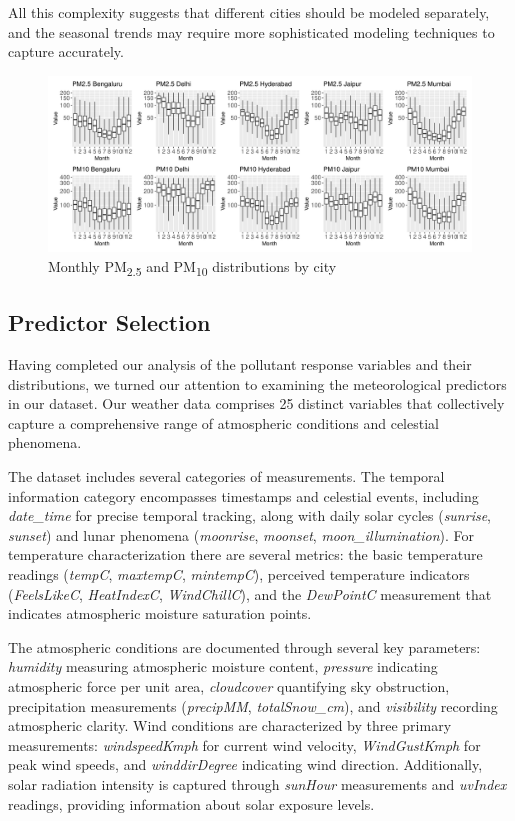 \documentclass[twoside,11pt]{article}
\begin{document}
All this complexity suggests that different cities should be modeled separately, and the seasonal trends may require more sophisticated modeling techniques to capture accurately.

\begin{figure}[H]
  \centering
  \includegraphics[width=\textwidth]{assets/seasonal-trends.png}
  \caption{Monthly PM\textsubscript{2.5} and PM\textsubscript{10} distributions by city}
  \label{fig:seasonal_trends}
\end{figure}

\subsection{Predictor Selection}

Having completed our analysis of the pollutant response variables and their distributions, we turned our attention to examining the meteorological predictors in our dataset. Our weather data comprises 25 distinct variables that collectively capture a comprehensive range of atmospheric conditions and celestial phenomena.

The dataset includes several categories of measurements. The temporal information category encompasses timestamps and celestial events, including \textit{date\_time} for precise temporal tracking, along with daily solar cycles (\textit{sunrise}, \textit{sunset}) and lunar phenomena (\textit{moonrise}, \textit{moonset}, \textit{moon\_illumination}). For temperature characterization there are several metrics: the basic temperature readings (\textit{tempC}, \textit{maxtempC}, \textit{mintempC}), perceived temperature indicators (\textit{FeelsLikeC}, \textit{HeatIndexC}, \textit{WindChillC}), and the \textit{DewPointC} measurement that indicates atmospheric moisture saturation points.

The atmospheric conditions are documented through several key parameters: \textit{humidity} measuring atmospheric moisture content, \textit{pressure} indicating atmospheric force per unit area, \textit{cloudcover} quantifying sky obstruction, precipitation measurements (\textit{precipMM}, \textit{totalSnow\_cm}), and \textit{visibility} recording atmospheric clarity. Wind conditions are characterized by three primary measurements: \textit{windspeedKmph} for current wind velocity, \textit{WindGustKmph} for peak wind speeds, and \textit{winddirDegree} indicating wind direction. Additionally, solar radiation intensity is captured through \textit{sunHour} measurements and \textit{uvIndex} readings, providing information about solar exposure levels.
\end{document}
